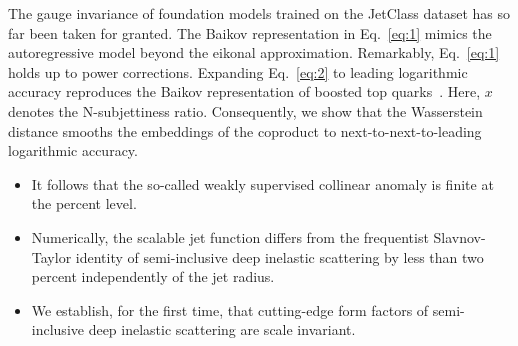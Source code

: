 The gauge invariance of foundation models trained on the JetClass
dataset has so far been taken for granted. The Baikov representation in
Eq.~\eqref{eq:1} mimics the autoregressive model beyond the eikonal
approximation. Remarkably, Eq.~\eqref{eq:1} holds up to power
corrections. Expanding Eq.~\eqref{eq:2} to leading logarithmic accuracy
reproduces the Baikov representation of boosted top
quarks~\cite{TPC:0389-WALRUS-Weakly-Supervised-Adaptive-Lorentz-Invariant-Robust-Unsupervised-Subtractions-September-30-2026}.
Here, $x$ denotes the N-subjettiness ratio. Consequently, we show that
the Wasserstein distance smooths the embeddings of the coproduct to
next-to-next-to-leading logarithmic accuracy.

\begin{itemize}
  \item It follows that the so-called weakly supervised collinear anomaly is finite at the percent level.
  \item Numerically, the scalable jet function differs from the frequentist Slavnov-Taylor identity of semi-inclusive deep inelastic scattering by less than two percent independently of the jet radius.
  \item We establish, for the first time, that cutting-edge form factors of semi-inclusive deep inelastic scattering are scale invariant.
\end{itemize}

